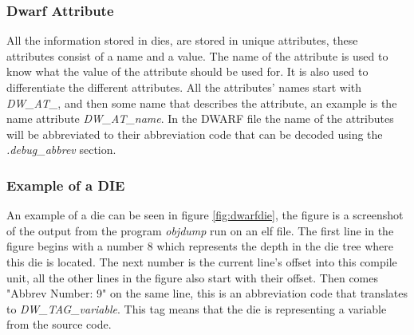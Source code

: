 

\subsubsection{Dwarf Attribute}\label{sec:dwarfattributes}
 


All the information stored in \glspl{die}, are stored in unique attributes, these attributes consist of a name and a value.
The name of the attribute is used to know what the value of the attribute should be used for.
It is also used to differentiate the different attributes.
All the attributes' names start with \emph{DW\_AT\_}, and then some name that describes the attribute, an example is the name attribute \emph{DW\_AT\_name}.
In the \gls{DWARF} file the name of the attributes will be abbreviated to their abbreviation code that can be decoded using the \emph{.debug\_abbrev} section.


\subsubsection{Example of a DIE}
An example of a \gls{die} can be seen in figure \ref{fig:dwarfdie}, the figure is a screenshot of the output from the program \emph{objdump} run on an \gls{elf} file.
The first line in the figure begins with a number $8$ which represents the depth in the \gls{die} tree where this \gls{die} is located.
The next number is the current line's offset into this compile unit, all the other lines in the figure also start with their offset.
Then comes "Abbrev Number: 9" on the same line, this is an abbreviation code that translates to \emph{DW\_TAG\_variable}.
This tag means that the \gls{die} is representing a variable from the source code.


